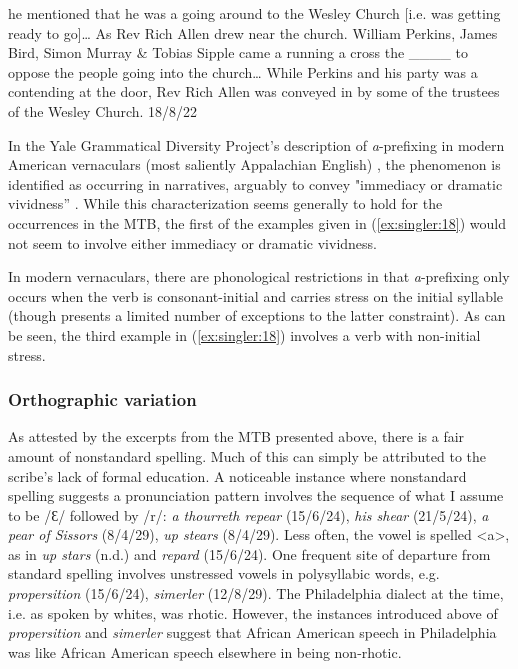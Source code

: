 \documentclass[output=paper,colorlinks,citecolor=brown]{langscibook}
\begin{document}
\ea%
    \label{ex:singler:18}
    
          he mentioned that he was a going around to the Wesley Church [i.e. was getting ready to go]… As Rev Rich Allen drew near the church. William Perkins, James Bird, Simon Murray \& Tobias Sipple came a running a cross the \_\_\_\_ to oppose the people going into the church… While Perkins and his party was a contending at the door, Rev Rich Allen was conveyed in by some of the trustees of the Wesley Church. 18/8/22 
          
\z

In the Yale Grammatical Diversity Project’s description of \textit{a}{}-prefixing in modern American vernaculars (most saliently Appalachian English) \citep{Matyiku2011}, the phenomenon is identified as occurring in narratives, arguably to convey "immediacy or dramatic vividness” \citep{Feagin1979}. While this characterization seems generally to hold for the occurrences in the MTB, the first of the examples given in (\ref{ex:singler:18}) would not seem to involve either immediacy or dramatic vividness.

In modern vernaculars, there are phonological restrictions in that \textit{a}{}-prefixing only occurs when the verb is consonant-initial and carries stress on the initial syllable (though \citealt{Montgomery2009} presents a limited number of exceptions to the latter constraint). As can be seen, the third example in (\ref{ex:singler:18}) involves a verb with non-initial stress.

\subsubsection{Orthographic variation}

As attested by the excerpts from the MTB presented above, there is a fair amount of nonstandard spelling. Much of this can simply be attributed to the scribe’s lack of formal education. A noticeable instance where nonstandard spelling suggests a pronunciation pattern involves the sequence of what I assume to be /Ɛ/ followed by /r/: \textit{a thourreth repear} (15/6/24), \textit{his shear} (21/5/24), \textit{a pear of Sissors} (8/4/29), \textit{up stears} (8/4/29). Less often, the vowel is spelled <a>, as in \textit{up stars} (n.d.) and \textit{repard} (15/6/24).  One frequent site of departure from standard spelling involves unstressed vowels in polysyllabic words, e.g. \textit{propersition} (15/6/24), \textit{simerler} (12/8/29). The Philadelphia dialect at the time, i.e. as spoken by whites, was rhotic. However, the instances introduced above of \textit{propersition} and \textit{simerler} suggest that African American speech in Philadelphia was like African American speech elsewhere in being non-rhotic.
\end{document}

